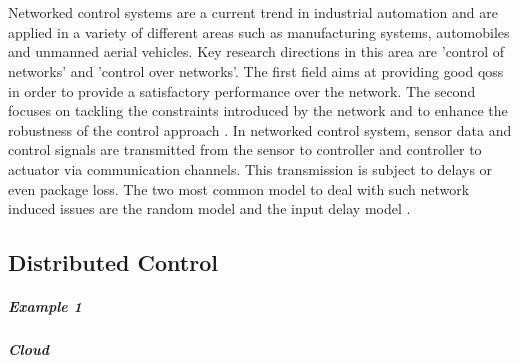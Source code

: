 \chapter{}
\label{sec:state_of_the_art}

Networked control systems are a current trend in industrial automation and are applied in a variety of different areas such as manufacturing systems, automobiles and unmanned aerial vehicles. Key research directions in this area are 'control of networks' and 'control over networks'. The first field aims at providing good \glspl{qos} in order to provide a satisfactory performance over the network. The second focuses on tackling the constraints introduced by the network and to enhance the robustness of the control approach \cite{zhang_networked_2020}.\newline
In networked control system, sensor data and control signals are transmitted from the sensor to controller and controller to actuator via communication channels. This transmission is subject to delays or even package loss. The two most common model to deal with such network induced issues are the random model and the input delay model \cite{zhang_networked_2020}.

\section{Distributed Control}
\paragraph{Example 1}
\paragraph{Cloud}

